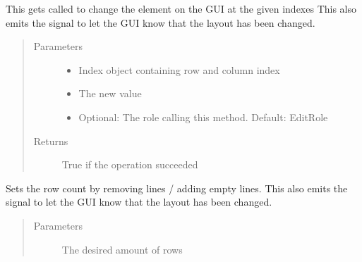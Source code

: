 \documentclass[letterpaper,10pt,english]{sphinxmanual}
\begin{document}
\begin{fulllineitems}
\begin{fulllineitems}
\begin{quote}
\begin{description}
\end{description}\end{quote}

\end{fulllineitems}


\begin{fulllineitems}
\label{\detokenize{src:src.PacketTableModel.PacketTableModel.setData}}
This gets called to change the element on the GUI at the given indexes
This also emits the  signal to let the GUI know that the layout has been changed.
\begin{quote}\begin{description}
\item[{Parameters}] \leavevmode\begin{itemize}
\item {} 
 \textendash{} Index object containing row and column index

\item {} 
 \textendash{} The new value

\item {} 
 \textendash{} Optional: The role calling this method. Default: EditRole

\end{itemize}

\item[{Returns}] \leavevmode
True if the operation succeeded

\end{description}\end{quote}

\end{fulllineitems}


\begin{fulllineitems}
\label{\detokenize{src:src.PacketTableModel.PacketTableModel.setRowCount}}
Sets the row count by removing lines / adding empty lines.
This also emits the  signal to let the GUI know that the layout has been changed.
\begin{quote}\begin{description}
\item[{Parameters}] \leavevmode
{} \textendash{} The desired amount of rows


\end{description}
\end{quote}
\end{fulllineitems}
\end{fulllineitems}
\end{document}
